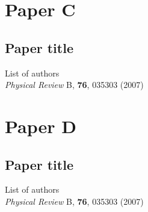 \chapter*{Paper C}
\section{Paper title}

\noindent List of authors\\

\noindent \textit{Physical Review} B, \textbf{76}, 035303 (2007)
\cleardoublepage




\chapter*{Paper D}
\section{Paper title}

\noindent List of authors\\

\noindent \textit{Physical Review} B, \textbf{76}, 035303 (2007)
\cleardoublepage

